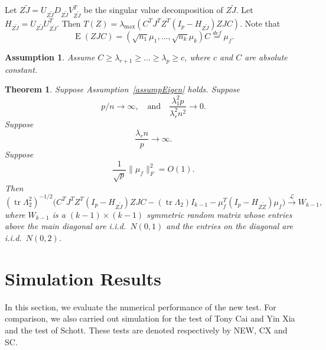\documentclass[review]{elsarticle}
\DeclareMathOperator{\mytr}{tr}
\DeclareMathOperator{\myE}{E}
\theoremstyle{plain}
\newtheorem{theorem}{\quad\quad Theorem}
\newtheorem{assumption}{\quad\quad Assumption}
\theoremstyle{definition}
\theoremstyle{remark}
\begin{document}
Let $Z\tilde{J}=U_{Z\tilde{J}}D_{Z\tilde{J}}V_{Z\tilde{J}}^T$ be the singular value decomposition of $Z\tilde{J}$. Let $H_{Z\tilde{J}}=U_{Z\tilde{J}}U_{Z\tilde{J}}^T$.
Then
$T(Z) = \lambda_{\max}(C^T J^T Z^T (I_p-H_{Z\tilde{J}})ZJC)$.
Note that
$$
\myE (ZJC) =(\sqrt{n_1}\mu_1,\ldots,\sqrt{n_k}\mu_k) C\overset{def}{=}\mu_{f}.
$$


\begin{assumption}\label{assumpEigen}
    Assume $C \geq \lambda_{r+1} \geq \ldots \geq \lambda_{p} \geq c$, where $c$ and $C$ are absolute constant.
\end{assumption}







\begin{theorem}\label{thm1}
    Suppose Assumption~\eqref{assumpEigen} holds. Suppose 
    \begin{equation}
    p/n\to \infty,\quad\text{and}\quad \frac{\lambda_1^2 p}{\lambda_r^2 n^2}\to 0.
    \end{equation}
    Suppose
    \begin{equation}
        \frac{\lambda_r n}{p}\to \infty.
    \end{equation}
    Suppose
    \begin{equation}
        \frac{1}{\sqrt{p}}\|\mu_f\|_F^2=O(1).
    \end{equation}
    Then
    \begin{equation}
        (\mytr \Lambda_2^2)^{-1/2}\big( C^TJ^T Z^T(I_p-H_{Z\tilde J}) ZJC-(\mytr \Lambda_2) I_{k-1} -\mu_f^T(I_p-H_{Z\tilde Z})\mu_f\big)\xrightarrow{\mathcal{L}} W_{k-1},
    \end{equation}
where $W_{k-1}$ is a $(k-1)\times(k-1)$ symmetric random matrix whose entries above the main diagonal are i.i.d.\ $N(0,1)$ and the entries on the diagonal are i.i.d.\ $N(0,2)$.
\end{theorem}

\section{Simulation Results}

In this section, we evaluate the numerical performance of the new test. For comparison, we also carried out simulation for the test of Tony Cai and Yin Xia and the test of Schott. These tests are denoted respectively by NEW, CX and SC.
\end{document}
